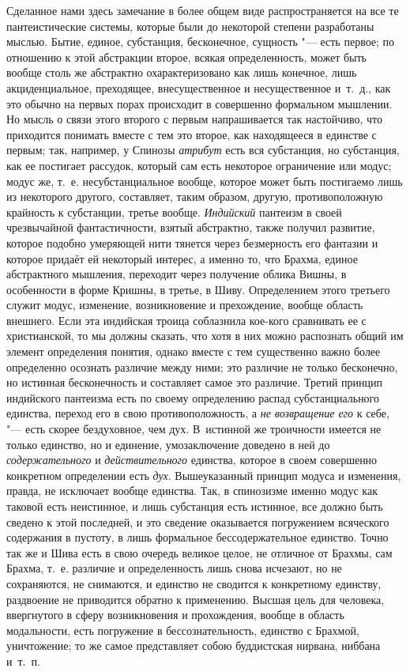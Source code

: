 Сделанное нами здесь замечание в более общем виде распространяется на все те
пантеистические системы, которые были до некоторой степени разработаны
мыслью. Бытие, единое, субстанция, бесконечное, сущность "--- есть первое; по
отношению к этой абстракции второе, всякая определенность, может быть
вообще столь же абстрактно охарактеризовано как лишь конечное, лишь
акциденциальное, преходящее, внесущественное и несущественное и~т.~д., как
это обычно на первых порах происходит в совершенно формальном мышлении. Но
мысль о связи этого второго с первым напрашивается так настойчиво, что
приходится понимать вместе с тем это второе, как находящееся в единстве с
первым; так, например, у Спинозы {\em атрибут} есть вся
субстанция, но субстанция, как ее постигает рассудок, который сам есть
некоторое ограничение или модус; модус же, т.~е. несубстанциальное вообще,
которое может быть постигаемо лишь из некоторого другого, составляет, таким
образом, другую, противоположную крайность к субстанции, третье вообще.
{\em Индийский} пантеизм в своей чрезвычайной
фантастичности, взятый абстрактно, также получил развитие,
которое подобно умеряющей нити тянется через безмерность его фантазии
и которое придаёт ей некоторый интерес, а именно то, что Брахма,
единое абстрактного мышления, переходит через получение
облика Вишны, в особенности в форме Кришны, в третье, в Шиву. Определением
этого третьего служит модус, изменение, возникновение и прехождение, вообще
область внешнего. Если эта индийская троица соблазнила кое-кого сравнивать
ее с христианской, то мы должны сказать, что хотя в них можно распознать
общий им элемент определения понятия, однако вместе с тем существенно важно
более определенно осознать различие между ними; это различие не только
бесконечно, но истинная бесконечность и составляет самое это различие.
Третий принцип индийского пантеизма есть по своему определению распад
субстанциального единства, переход его в свою противоположность, а
{\em не возвращение его} к себе, "--- есть скорее
бездуховное, чем дух. В~истинной же троичности имеется не только единство,
но и единение, умозаключение доведено в ней до
{\em содержательного} и
{\em действительного} единства, которое в своем
совершенно конкретном определении есть {\em дух}.
Вышеуказанный принцип модуса и изменения, правда, не исключает вообще
единства. Так, в спинозизме именно модус как таковой есть неистинное, и
лишь субстанция есть истинное, все должно быть сведено к этой последней, и
это сведение оказывается погружением всяческого содержания в пустоту, в
лишь формальное бессодержательное единство. Точно так же и Шива есть в свою
очередь великое целое, не отличное от Брахмы, сам Брахма, т.~е. различие и
определенность лишь снова исчезают, но не сохраняются, не снимаются, и
единство не сводится к конкретному единству, раздвоение не приводится
обратно к применению. Высшая цель для человека, ввергнутого в сферу
возникновения и прохождения, вообще в область модальности, есть погружение
в бессознательность, единство с Брахмой, уничтожение; то же самое
представляет собою буддистская нирвана, ниббана и~т.~п.

